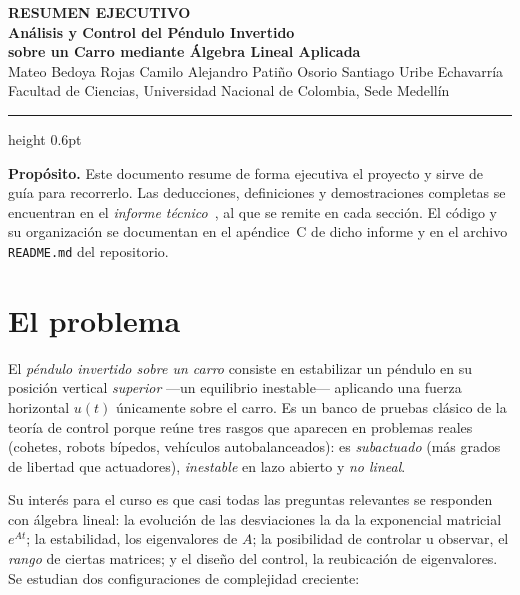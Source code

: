 \documentclass[11pt,letterpaper]{article}
\begin{document}
\begin{center}
    {\footnotesize\bfseries\color{acento2} RESUMEN EJECUTIVO}\\[0.4em]
    {\LARGE\bfseries Análisis y Control del Péndulo Invertido \\[0.15em]
     sobre un Carro mediante Álgebra Lineal Aplicada}\\[0.6em]
    {\normalsize Mateo Bedoya Rojas \quad\textbullet\quad Camilo Alejandro Patiño Osorio \quad\textbullet\quad Santiago Uribe Echavarría}\\[0.3em]
    {\footnotesize Facultad de Ciencias, Universidad Nacional de Colombia, Sede Medellín}
\end{center}
\vspace{0.2em}
\hrule height 0.6pt
\vspace{0.8em}

\noindent
\begin{clave}
\small
\textbf{Propósito.} Este documento resume de forma ejecutiva el proyecto y sirve
de guía para recorrerlo. Las deducciones, definiciones y demostraciones
completas se encuentran en el \emph{informe técnico}~\cite{tecnico}, al que se
remite en cada sección. El código y su organización se documentan en el
apéndice~C de dicho informe y en el archivo \texttt{README.md} del
repositorio.
\end{clave}

\section{El problema}

El \emph{péndulo invertido sobre un carro} consiste en estabilizar un péndulo en
su posición vertical \emph{superior} ---un equilibrio inestable--- aplicando una
fuerza horizontal $u(t)$ únicamente sobre el carro. Es un banco de pruebas
clásico de la teoría de control porque reúne tres rasgos que aparecen en
problemas reales (cohetes, robots bípedos, vehículos autobalanceados):
es \emph{subactuado} (más grados de libertad que actuadores),
\emph{inestable} en lazo abierto y \emph{no lineal}.

Su interés para el curso es que casi todas las preguntas relevantes se responden
con álgebra lineal: la evolución de las desviaciones la da la exponencial
matricial $e^{At}$; la estabilidad, los eigenvalores de $A$; la posibilidad de
controlar u observar, el \emph{rango} de ciertas matrices; y el diseño del
control, la reubicación de eigenvalores. Se estudian dos configuraciones de
complejidad creciente:
\end{document}
